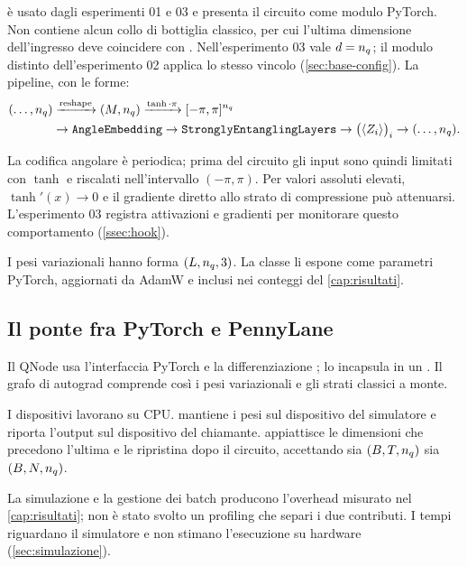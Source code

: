  è usato dagli esperimenti 01 e 03 e presenta il circuito
come modulo PyTorch.
Non contiene alcun collo di bottiglia classico, per cui l'ultima dimensione
dell'ingresso deve coincidere con . Nell'esperimento 03 vale
$d=n_q$; il modulo distinto dell'esperimento 02 applica lo stesso vincolo
(\cref{sec:base-config}). La pipeline, con le forme:
\begin{equation}
  \begin{aligned}
    (\ldots, n_q)
    &\xrightarrow{\text{reshape}} (M, n_q)
    \xrightarrow{\tanh \cdot \pi} [-\pi, \pi]^{n_q} \\
    &\to \texttt{AngleEmbedding}
    \to \texttt{StronglyEntanglingLayers}
    \to \big(\langle Z_i \rangle\big)_i
    \to (\ldots, n_q).
  \end{aligned}
  \label{eq:pipeline-vqc}
\end{equation}

La codifica angolare è periodica; prima del circuito gli input sono quindi
limitati con $\tanh$ e riscalati nell'intervallo $(-\pi,\pi)$. Per valori assoluti
elevati, $\tanh'(x)\to0$ e il gradiente diretto allo strato di compressione può
attenuarsi. L'esperimento 03 registra attivazioni e gradienti per monitorare questo
comportamento (\cref{ssec:hook}).

I pesi variazionali hanno forma $(L, n_q, 3)$. La classe
 li espone come parametri PyTorch, aggiornati da AdamW e
inclusi nei conteggi del \cref{cap:risultati}.

\subsection{Il ponte fra PyTorch e PennyLane}
\label{sec:integrazione}

Il QNode usa l'interfaccia PyTorch e la differenziazione ;
 lo incapsula in un . Il grafo di
autograd comprende così i pesi variazionali e gli strati classici a monte.

I dispositivi  lavorano su CPU. 
mantiene i pesi sul dispositivo del simulatore e riporta l'output sul dispositivo
del chiamante.  appiattisce le dimensioni che precedono
l'ultima e le ripristina dopo il circuito, accettando sia
$(B, T, n_q)$ sia $(B, N, n_q)$.

\begin{limite}
La simulazione e la gestione dei batch producono l'overhead misurato nel
\cref{cap:risultati}; non è stato svolto un profiling che separi i due contributi.
I tempi riguardano il simulatore e non stimano l'esecuzione su hardware
(\cref{sec:simulazione}).
\end{limite}

